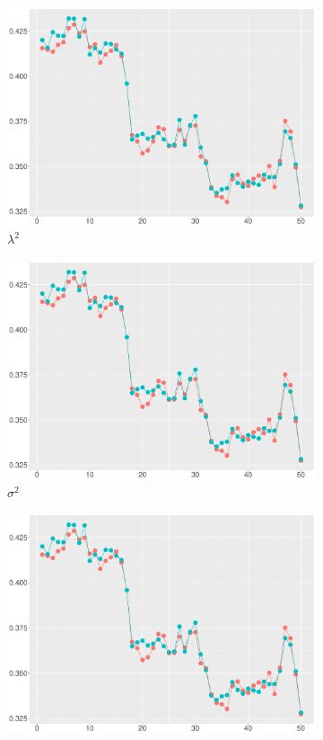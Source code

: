 \begin{figure}[h]
\begin{subfigure}[b]{0.45\textwidth}
\includegraphics[width=\textwidth]{Chapters/05MCMCOU/plots/realdatacomparelab2batchwindow2.pdf}
\caption{$\lambda^2$}
\end{subfigure}
\begin{subfigure}[b]{0.45\textwidth}
\includegraphics[width=\textwidth]{Chapters/05MCMCOU/plots/realdatacomparesig2batchwindow2.pdf}
\caption{$\sigma^2$}
\end{subfigure}
\begin{subfigure}[b]{0.45\textwidth}
\includegraphics[width=\textwidth]{Chapters/05MCMCOU/plots/realdatacomparetau2batchwindow2.pdf}

\end{subfigure}
\end{figure}

